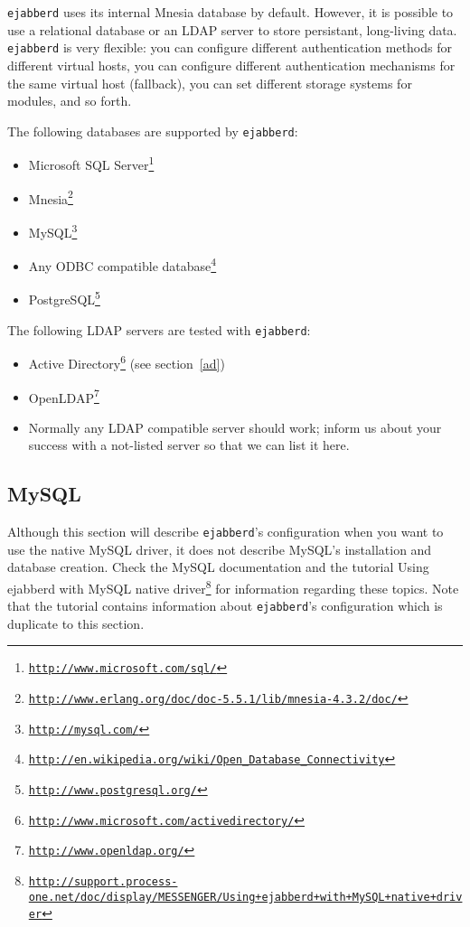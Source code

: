 \documentclass[a4paper,10pt]{article}
\newcommand{\ind}[1]{\begin{latexonly}\index{#1}\end{latexonly}}
\newcommand{\ejabberd}{\texttt{ejabberd}}
\gdef\footahref#1#2{#2\footnote{\href{#1}{\texttt{#1}}}}
\begin{document}
\ejabberd{} uses its internal Mnesia database by default. However, it is
possible to use a relational database or an LDAP server to store persistant,
long-living data. \ejabberd{} is very flexible: you can configure different
authentication methods for different virtual hosts, you can configure different
authentication mechanisms for the same virtual host (fallback), you can set
different storage systems for modules, and so forth.

The following databases are supported by \ejabberd{}:
\begin{itemize}
\item \footahref{http://www.microsoft.com/sql/}{Microsoft SQL Server}
\item \footahref{http://www.erlang.org/doc/doc-5.5.1/lib/mnesia-4.3.2/doc/}{Mnesia}
\item \footahref{http://mysql.com/}{MySQL}
\item \footahref{http://en.wikipedia.org/wiki/Open\_Database\_Connectivity}{Any ODBC compatible database}
\item \footahref{http://www.postgresql.org/}{PostgreSQL}
\end{itemize}

The following LDAP servers are tested with \ejabberd{}:
\begin{itemize}
\item \footahref{http://www.microsoft.com/activedirectory/}{Active Directory}
  (see section~\ref{ad})
\item \footahref{http://www.openldap.org/}{OpenLDAP}
\item Normally any LDAP compatible server should work; inform us about your
  success with a not-listed server so that we can list it here.
\end{itemize}

\subsection{MySQL}
\label{mysql}
\ind{MySQL}\ind{MySQL!schema}

Although this section will describe \ejabberd{}'s configuration when you want to
use the native MySQL driver, it does not describe MySQL's installation and
database creation. Check the MySQL documentation and the tutorial \footahref{http://support.process-one.net/doc/display/MESSENGER/Using+ejabberd+with+MySQL+native+driver}{Using ejabberd with MySQL native driver} for information regarding these topics.
Note that the tutorial contains information about \ejabberd{}'s configuration
which is duplicate to this section.
\end{document}
